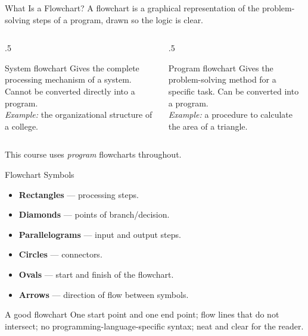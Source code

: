 \documentclass[9pt,aspectratio=169,xcolor=table]{beamer}
\begin{document}
\begin{frame}{What Is a Flowchart?}
    \leavevmode
    A \alert{flowchart} is a graphical representation of the
    problem-solving steps of a program, drawn so the logic is clear.

    \vspace{2mm}
    \begin{columns}[t]
        \begin{column}{.5\textwidth}
            \begin{block}{System flowchart}
                \small Gives the complete processing mechanism of a
                system. \alert{Cannot} be converted directly into a
                program. \\[1mm]
                \emph{Example:} the organizational structure of a
                college.
            \end{block}
        \end{column}
        \begin{column}{.5\textwidth}
            \begin{block}{Program flowchart}
                \small Gives the problem-solving method for a specific
                task. \alert{Can} be converted into a program. \\[1mm]
                \emph{Example:} a procedure to calculate the area of a
                triangle.
            \end{block}
        \end{column}
    \end{columns}

    \vspace{3mm}
    {\small This course uses \emph{program} flowcharts throughout.}
\end{frame}

\begin{frame}{Flowchart Symbols}
    \leavevmode
    \small
    \begin{itemize}\itemsep3pt
        \item \textbf{Rectangles} --- processing steps.
        \item \textbf{Diamonds} --- points of branch/decision.
        \item \textbf{Parallelograms} --- input and output steps.
        \item \textbf{Circles} --- connectors.
        \item \textbf{Ovals} --- start and finish of the flowchart.
        \item \textbf{Arrows} --- direction of flow between symbols.
    \end{itemize}

    \vspace{3mm}
    \begin{alertblock}{A good flowchart}
        One start point and one end point; flow lines that do not
        intersect; no programming-language-specific syntax; neat and
        clear for the reader.
    \end{alertblock}
\end{frame}
\end{document}
